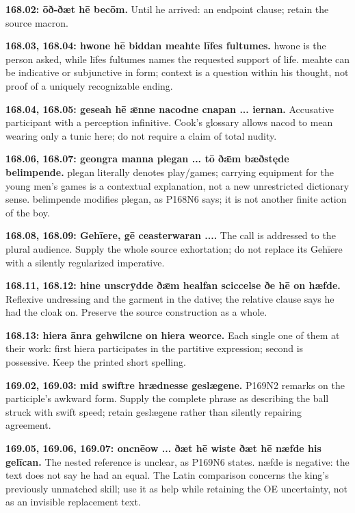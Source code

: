 \textbf{168.02: ōð-ðæt hē becōm.} Until he arrived: an endpoint clause; retain the source macron.

\textbf{168.03, 168.04: hwone hē biddan meahte līfes fultumes.} hwone is the person asked, while līfes fultumes names the requested support of life. meahte can be indicative or subjunctive in form; context is a question within his thought, not proof of a uniquely recognizable ending.

\textbf{168.04, 168.05: geseah hē ǣnne nacodne cnapan ... iernan.} Accusative participant with a perception infinitive. Cook’s glossary allows nacod to mean wearing only a tunic here; do not require a claim of total nudity.

\textbf{168.06, 168.07: geongra manna plegan ... tō ðǣm bæðstęde belimpende.} plegan literally denotes play/\allowbreak{}games; carrying equipment for the young men’s games is a contextual explanation, not a new unrestricted dictionary sense. belimpende modifies plegan, as P168N6 says; it is not another finite action of the boy.

\textbf{168.08, 168.09: Gehīere, gē ceasterwaran ....} The call is addressed to the plural audience. Supply the whole source exhortation; do not replace its Gehīere with a silently regularized imperative.

\textbf{168.11, 168.12: hine unscrȳdde ðǣm healfan sciccelse ðe hē on hæfde.} Reflexive undressing and the garment in the dative; the relative clause says he had the cloak on. Preserve the source construction as a whole.

\textbf{168.13: hiera ānra gehwilcne on hiera weorce.} Each single one of them at their work: first hiera participates in the partitive expression; second is possessive. Keep the printed short spelling.

\textbf{169.02, 169.03: mid swiftre hrædnesse geslægene.} P169N2 remarks on the participle’s awkward form. Supply the complete phrase as describing the ball struck with swift speed; retain geslægene rather than silently repairing agreement.

\textbf{169.05, 169.06, 169.07: oncnēow ... ðæt hē wiste ðæt hē næfde his gelīcan.} The nested reference is unclear, as P169N6 states. næfde is negative: the text does not say he had an equal. The Latin comparison concerns the king’s previously unmatched skill; use it as help while retaining the OE uncertainty, not as an invisible replacement text.

